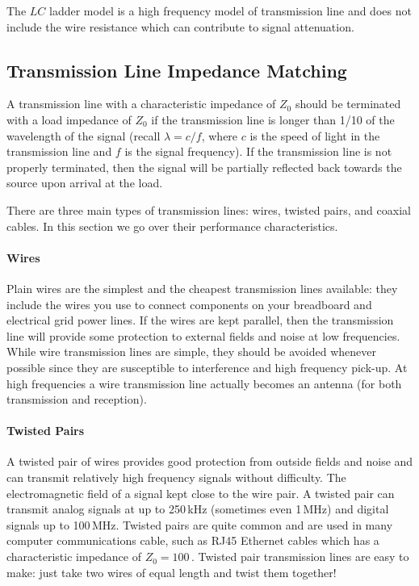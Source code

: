 \documentclass{article}
\begin{document}
The $LC$ ladder model is a high frequency model of transmission line and does not include the wire resistance which can contribute to signal attenuation. 

\subsection{Transmission Line Impedance Matching}
A transmission line with a characteristic impedance of $Z_0$ should be terminated with a load impedance of $Z_0$ if the transmission line is longer than 1/10 of the wavelength of the signal (recall $\lambda = c/f$, where $c$ is the speed of light in the transmission line and $f$ is the signal frequency). If the transmission line is not properly terminated, then the signal will be partially reflected back towards the source upon arrival at the load.

There are three main types of transmission lines: wires, twisted pairs, and coaxial cables. In this section we go over their performance characteristics.

\paragraph{Wires}
Plain wires are the simplest and the cheapest transmission lines available: they include the wires you use to connect components on your breadboard and electrical grid power lines. If the wires are kept parallel, then the transmission line will provide some protection to external fields and noise at low frequencies. While wire transmission lines are simple, they should be avoided whenever possible since they are susceptible to interference and high frequency pick-up. At high frequencies a wire transmission line actually becomes an antenna (for both transmission and reception).

\paragraph{Twisted Pairs}
A twisted pair of wires provides good protection from outside fields and noise and can transmit relatively high frequency signals without difficulty. The electromagnetic field of a signal kept close to the wire pair. A twisted pair can transmit analog signals at up to 250\,kHz (sometimes even 1\,MHz) and digital signals up to 100\,MHz. Twisted pairs are quite common and are used in many computer communications cable, such as RJ45 Ethernet cables which has a characteristic impedance of $Z_0 = 100$\,\Ohm. Twisted pair transmission lines are easy to make: just take two wires of equal length and twist them together!
\end{document}
